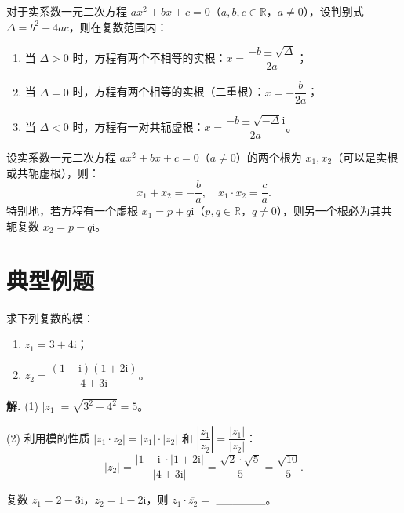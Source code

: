 \documentclass[11pt]{ctexrep}
\begin{document}
\begin{property}[实系数一元二次方程的求根公式]
    对于实系数一元二次方程 $ax^2 + bx + c = 0$（$a, b, c \in \mathbb{R}$，$a \neq 0$），设判别式 $\Delta = b^2 - 4ac$，则在复数范围内：
    \begin{enumerate}
        \item 当 $\Delta > 0$ 时，方程有两个不相等的实根：$x = \dfrac{-b \pm \sqrt{\Delta}}{2a}$；
        \item 当 $\Delta = 0$ 时，方程有两个相等的实根（二重根）：$x = -\dfrac{b}{2a}$；
        \item 当 $\Delta < 0$ 时，方程有一对共轭虚根：$x = \dfrac{-b \pm \sqrt{-\Delta}\mathrm{i}}{2a}$。
    \end{enumerate}
\end{property}

\begin{property}[实系数一元二次方程根与系数的关系]
    设实系数一元二次方程 $ax^2 + bx + c = 0$（$a \neq 0$）的两个根为 $x_1, x_2$（可以是实根或共轭虚根），则：
    \[
        x_1 + x_2 = -\frac{b}{a}, \quad x_1 \cdot x_2 = \frac{c}{a}.
    \]
    特别地，若方程有一个虚根 $x_1 = p + q\mathrm{i}$（$p, q \in \mathbb{R}$，$q \neq 0$），则另一个根必为其共轭复数 $x_2 = p - q\mathrm{i}$。
\end{property}

\section*{典型例题}

\begin{example}[复数模的计算]
    求下列复数的模：
    \begin{enumerate}
        \item $z_1 = 3 + 4\mathrm{i}$；
        \item $z_2 = \dfrac{(1 - \mathrm{i})(1 + 2\mathrm{i})}{4 + 3\mathrm{i}}$。
    \end{enumerate}
\end{example}

\textbf{解.} (1) $|z_1| = \sqrt{3^2 + 4^2} = 5$。

(2) 利用模的性质 $|z_1 \cdot z_2| = |z_1| \cdot |z_2|$ 和 $\left|\dfrac{z_1}{z_2}\right| = \dfrac{|z_1|}{|z_2|}$：
\[
    |z_2| = \frac{|1 - \mathrm{i}| \cdot |1 + 2\mathrm{i}|}{|4 + 3\mathrm{i}|} = \frac{\sqrt{2} \cdot \sqrt{5}}{5} = \frac{\sqrt{10}}{5}.
\]

\begin{realexam}[2025 长宁二模]
    复数 $z_1 = 2 - 3\mathrm{i}$，$z_2 = 1 - 2\mathrm{i}$，则 $z_1 \cdot \overline{z_2} = $ \_\_\_\_\_\_。
\end{realexam}
\end{document}
